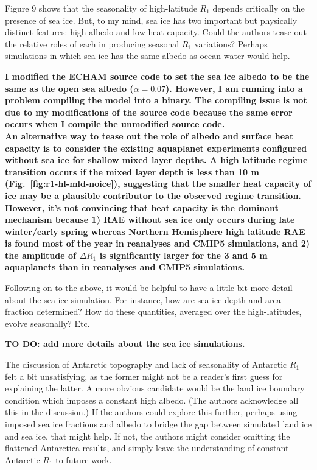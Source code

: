 \documentclass{article}
\begin{document}
Figure 9 shows that the seasonality of high-latitude $R_1$ depends critically on the presence of sea ice. But, to my mind, sea ice has two important but physically distinct features: high albedo and low heat capacity. Could the authors tease out the relative roles of each in producing seasonal $R_1$ variations? Perhaps simulations in which sea ice has the same albedo as ocean water would help.

{\color{red}\textbf{I modified the ECHAM source code to set the sea ice albedo to be the same as the open sea albedo ($\alpha=0.07$). However, I am running into a problem compiling the model into a binary. The compiling issue is not due to my modifications of the source code because the same error occurs when I compile the unmodified source code.\\ \newline An alternative way to tease out the role of albedo and surface heat capacity is to consider the existing aquaplanet experiments configured without sea ice for shallow mixed layer depths. A high latitude regime transition occurs if the mixed layer depth is less than 10 m (Fig.~\ref{fig:r1-hl-mld-noice}), suggesting that the smaller heat capacity of ice may be a plausible contributor to the observed regime transition. However, it's not convincing that heat capacity is the dominant mechanism because 1) RAE without sea ice only occurs during late winter/early spring whereas Northern Hemisphere high latitude RAE is found most of the year in reanalyses and CMIP5 simulations, and 2) the amplitude of $\Delta R_1$ is significantly larger for the 3 and 5 m aquaplanets than in reanalyses and CMIP5 simulations.}}

Following on to the above, it would be helpful to have a little bit more detail about the sea ice simulation. For instance, how are sea-ice depth and area fraction determined? How do these quantities, averaged over the high-latitudes, evolve seasonally? Etc.

{\color{red}\textbf{TO DO: add more details about the sea ice simulations.}}

The discussion of Antarctic topography and lack of seasonality of Antarctic $R_1$ felt a bit unsatisfying, as the former might not be a reader's first guess for explaining the latter. A more obvious candidate would be the land ice boundary condition which imposes a constant high albedo. (The authors acknowledge all this in the discussion.) If the authors could explore this further, perhaps using imposed sea ice fractions and albedo to bridge the gap between simulated land ice and sea ice, that might help. If not, the authors might consider omitting the flattened Antarctica results, and simply leave the understanding of constant Antarctic $R_1$ to future work.
\end{document}
